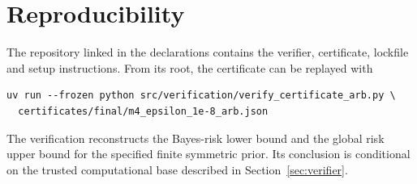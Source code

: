 \section{Reproducibility}
\label{app:reproducibility}

The repository linked in the declarations contains the verifier, certificate,
lockfile and setup instructions. From its root, the certificate can be replayed
with
\begin{verbatim}
uv run --frozen python src/verification/verify_certificate_arb.py \
  certificates/final/m4_epsilon_1e-8_arb.json
\end{verbatim}
The verification reconstructs the Bayes-risk lower bound and the global
risk upper bound for the specified finite symmetric prior. Its conclusion is
conditional on the trusted computational base described in
Section~\ref{sec:verifier}.
